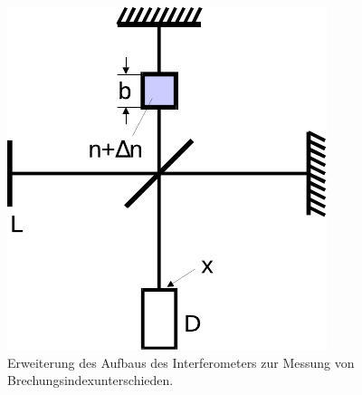     \begin{figure}
        \centering
        \includegraphics{content/img/Abb_5.pdf}
        \caption{Erweiterung des Aufbaus des Interferometers zur Messung von Brechungsindexunterschieden. \cite{versuchsanleitung}}
    \end{figure}

